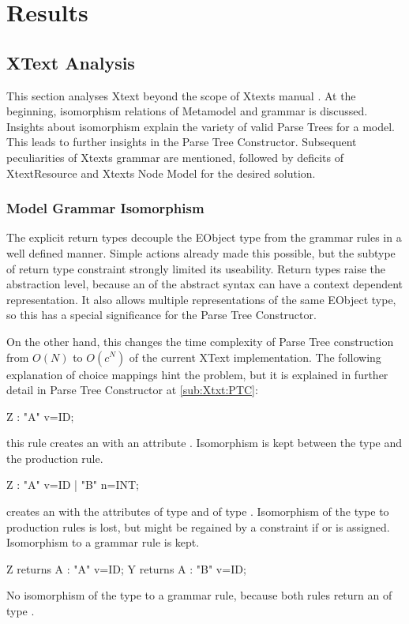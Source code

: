 \chapter{Results}

\section{XText Analysis}
This section analyses Xtext beyond the scope of Xtexts manual \cite{XTextMan}. At the beginning, isomorphism relations of Metamodel and grammar is discussed. Insights about isomorphism explain the variety of valid Parse Trees for a model. This leads to further insights in the Parse Tree Constructor. Subsequent peculiarities of Xtexts grammar are mentioned, followed by deficits of XtextResource and Xtexts Node Model for the desired solution.

\subsection{Model Grammar Isomorphism}
The explicit return types decouple the EObject type from the grammar rules in a well defined manner. Simple actions already made this possible, but the subtype of return type constraint strongly limited its useability. Return types raise the abstraction level, because an  of the abstract syntax can have a context dependent representation. It also allows multiple representations of the same EObject type, so this has a special significance for the Parse Tree Constructor.

On the other hand, this changes the time complexity of Parse Tree construction from $O(N)$ to $O(c^N)$ of the current XText implementation. The following explanation of choice mappings hint the problem, but it is explained in further detail in Parse Tree Constructor at \ref{sub:Xtxt:PTC}: 
\begin{xtxt}
Z 	:  "A" v=ID;
\end{xtxt}
this rule creates an   with an  attribute . Isomorphism is kept between the type  and the production rule.
\begin{xtxt}
Z 	:  "A" v=ID  
	|  "B" n=INT;
	\end{xtxt}
creates an   with the attributes  of type  and  of type .  Isomorphism of the type to production rules is lost, but might be regained by a constraint if  or  is assigned. Isomorphism to a grammar rule is kept.
\begin{xtxt}
Z returns A : "A" v=ID;
Y returns A : "B" v=ID;
\end{xtxt}
No isomorphism of the type  to a grammar rule, because both rules return an  of type .

